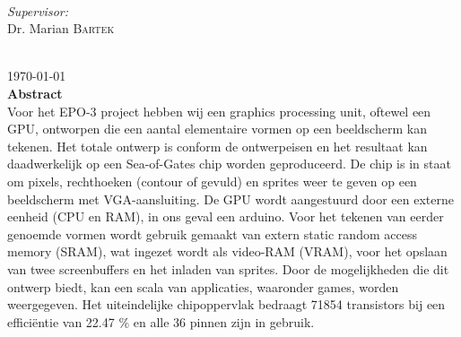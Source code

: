 \documentclass[12pt]{scrreprt}
\begin{document}
\begin{titlepage}
\begin{minipage}{0.4\textwidth}
\begin{flushleft}
\end{flushleft}
\end{minipage}
~
\begin{minipage}{0.4\textwidth}
\begin{flushright} \large
\emph{Supervisor:} \\
Dr. Marian \textsc{Bartek} %
\end{flushright}
\end{minipage}\\[1.5cm]



{\large \today}\\ [1.5cm]


 
% 

\textbf{Abstract} \\
Voor het EPO-3 project hebben wij een graphics processing unit, oftewel een GPU, ontworpen die een aantal elementaire vormen op een beeldscherm kan tekenen. Het totale ontwerp is conform de ontwerpeisen en het resultaat kan daadwerkelijk op een Sea-of-Gates chip worden geproduceerd. De chip is in staat om pixels, rechthoeken (contour of gevuld) en sprites weer te geven op een beeldscherm met VGA-aansluiting. De GPU wordt aangestuurd door een externe eenheid (CPU en RAM), in ons geval een arduino. Voor het tekenen van eerder genoemde vormen wordt gebruik gemaakt van extern static random access memory (SRAM), wat ingezet wordt als video-RAM (VRAM), voor het opslaan van twee screenbuffers en het inladen van sprites. Door de mogelijkheden die dit ontwerp biedt, kan een scala van applicaties, waaronder games, worden weergegeven. Het uiteindelijke chipoppervlak bedraagt 71854 transistors bij een efficiëntie van 22.47 \% en alle 36 pinnen zijn in gebruik.

\vfill %

\end{titlepage}
\end{document}
